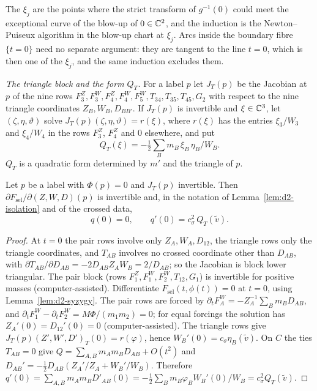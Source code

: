 \begin{remark}\label{rem:d2-corank-two}
The $\xi_j$ are the points where the strict transform of $g^{-1}(0)$ could meet the exceptional
curve of the blow-up of $0\in\mathbb{C}^2$, and the induction is the Newton--Puiseux algorithm in the
blow-up chart at $\xi_j$.  Arcs inside the boundary fibre $\{t=0\}$ need no separate argument:
they are tangent to the line $t=0$, which is then one of the $\xi_j$, and the same induction
excludes them.
\end{remark}

\emph{The triangle block and the form $Q_T$.}  For a label $p$ let $J_T(p)$ be the Jacobian at
$p$ of the nine rows $F^Z_3,F^W_3,F^Z_4,F^W_4,F^W_5,T_{34},T_{35},T_{45},G_2$ with respect to the
nine triangle coordinates $Z_B,W_B,D_{BB'}$.  If $J_T(p)$ is invertible and $\xi\in\mathbb{C}^3$, let
$(\zeta,\eta,\vartheta)$ solve $J_T(p)(\zeta,\eta,\vartheta)=r(\xi)$, where $r(\xi)$ has the
entries $\xi_3/W_3$ and $\xi_4/W_4$ in the rows $F^Z_3$, $F^Z_4$ and $0$ elsewhere, and put
\[
  Q_T(\xi)=-\tfrac12\textstyle\sum_Bm_B\,\xi_B\,\eta_B/W_B .
\]
$Q_T$ is a quadratic form determined by $m'$ and the triangle of $p$.

\begin{lemma}\label{lem:d2-second}
Let $p$ be a label with $\Phi(p)=0$ and $J_T(p)$ invertible.  Then
$\partial F_{\mathrm{sel}}/\partial(Z,W,D)(p)$ is invertible and, in the notation of
Lemma~\ref{lem:d2-isolation} and of the crossed data,
\[
  q(0)=0,\qquad q'(0)=c_\sigma^2\,Q_T(\tilde v).
\]
\end{lemma}

\begin{proof}
At $t=0$ the pair rows involve only $Z_A,W_A,D_{12}$, the triangle rows only the triangle
coordinates, and $T_{AB}$ involves no crossed coordinate other than $D_{AB}$, with
$\partial T_{AB}/\partial D_{AB}=-2D_{AB}Z_AW_B=2/D_{AB}$; so the Jacobian is block lower
triangular.  The pair block (rows $F^Z_1,F^W_1,F^W_2,T_{12},G_1$) is invertible for positive
masses (computer-assisted).  Differentiate $F_{\mathrm{sel}}(t,\phi(t))=0$ at $t=0$, using
Lemma~\ref{lem:d2-syzygy}.  The pair rows are forced by
$\partial_tF^W_A=-Z_A^{-1}\sum_Bm_BD_{AB}$, and
$\partial_tF^W_1-\partial_tF^W_2=M\Phi/(m_1m_2)=0$; for equal forcings the solution has
$Z_A'(0)=D_{12}'(0)=0$ (computer-assisted).  The triangle rows give
$J_T(p)(Z',W',D')_T(0)=r(\varphi)$, hence $W_B'(0)=c_\sigma\eta_B(\tilde v)$.  On $C$ the ties
$T_{AB}=0$ give $Q=\sum_{A,B}m_Am_BD_{AB}+O(t^2)$ and
$D_{AB}'=-\frac12D_{AB}(Z_A'/Z_A+W_B'/W_B)$.  Therefore
$q'(0)=\sum_{A,B}m_Am_BD'_{AB}(0)=-\frac12\sum_Bm_B\varphi_BW_B'(0)/W_B=c_\sigma^2Q_T(\tilde v)$.
\end{proof}

